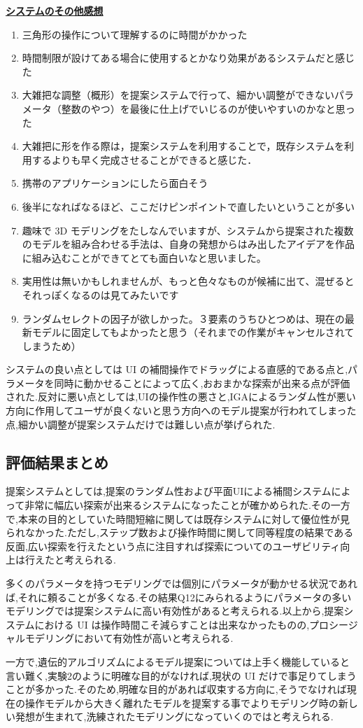 \textbf{\underline{システムのその他感想}}
\begin{enumerate}
    \item 三角形の操作について理解するのに時間がかかった
    \item 時間制限が設けてある場合に使用するとかなり効果があるシステムだと感じた
    \item 大雑把な調整（概形）を提案システムで行って、細かい調整ができないパラメータ（整数のやつ）を最後に仕上げでいじるのが使いやすいのかなと思った
    \item 大雑把に形を作る際は，提案システムを利用することで，既存システムを利用するよりも早く完成させることができると感じた．
    \item 携帯のアプリケーションにしたら面白そう
    \item 後半になればなるほど、ここだけピンポイントで直したいということが多い
    \item 趣味で 3D モデリングをたしなんでいますが、システムから提案された複数のモデルを組み合わせる手法は、自身の発想からはみ出したアイデアを作品に組み込むことができてとても面白いなと思いました。
    \item 実用性は無いかもしれませんが、もっと色々なものが候補に出て、混ぜるとそれっぽくなるのは見てみたいです
    \item ランダムセレクトの因子が欲しかった。３要素のうちひとつめは、現在の最新モデルに固定してもよかったと思う（それまでの作業がキャンセルされてしまうため）
\end{enumerate}


システムの良い点としては UI の補間操作でドラッグによる直感的である点と,パラメータを同時に動かせることによって広く,おおまかな探索が出来る点が評価された.反対に悪い点としては,UIの操作性の悪さと,IGAによるランダム性が悪い方向に作用してユーザが良くないと思う方向へのモデル提案が行われてしまった点,細かい調整が提案システムだけでは難しい点が挙げられた.

\clearpage
\subsection{評価結果まとめ}
提案システムとしては,提案のランダム性および平面UIによる補間システムによって非常に幅広い探索が出来るシステムになったことが確かめられた.その一方で,本来の目的としていた時間短縮に関しては既存システムに対して優位性が見られなかった.ただし,ステップ数および操作時間に関して同等程度の結果である反面,広い探索を行えたという点に注目すれば探索についてのユーザビリティ向上は行えたと考えられる.

多くのパラメータを持つモデリングでは個別にパラメータが動かせる状況であれば,それに頼ることが多くなる.その結果Q12にみられるようにパラメータの多いモデリングでは提案システムに高い有効性があると考えられる.以上から,提案システムにおける UI は操作時間こそ減らすことは出来なかったものの,プロシージャルモデリングにおいて有効性が高いと考えられる.


一方で,遺伝的アルゴリズムによるモデル提案については上手く機能していると言い難く,実験2のように明確な目的がなければ,現状の UI だけで事足りてしまうことが多かった.そのため,明確な目的があれば収束する方向に,そうでなければ現在の操作モデルから大きく離れたモデルを提案する事でよりモデリング時の新しい発想が生まれて,洗練されたモデリングになっていくのではと考えられる.